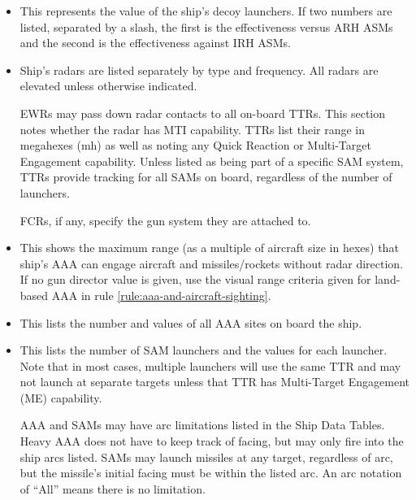 \begin{itemize}
    \item {} This represents the value of the ship's decoy launchers.  If two numbers are listed, separated by a slash, the first is the effectiveness versus ARH ASMs and the second is the effectiveness against IRH ASMs.

    \item {} Ship's radars are listed separately by type and frequency. All radars are elevated unless otherwise indicated.

        EWRs may pass down radar contacts to all on-board TTRs.  This section notes whether the radar has MTI capability. TTRs list their range in megahexes (mh) as well as noting any Quick Reaction or Multi-Target Engagement capability.  Unless listed as being part of a specific SAM system, TTRs provide tracking for all SAMs on board, regardless of the number of launchers.

        FCRs, if any, specify the gun system they are attached to.

    \item {} This shows the maximum range (as a multiple of aircraft size in hexes) that ship's AAA can engage aircraft and missiles/rockets without radar direction.  If no gun director value is given, use the visual range criteria given for land-based AAA in rule \ref{rule:aaa-and-aircraft-sighting}.

    \item {} This lists the number and values of all AAA sites on board the ship.

    \item {} This lists the number of SAM launchers and the values for each launcher.  Note that in most cases, multiple launchers will use the same TTR and may not launch at separate targets unless that TTR has Multi-Target Engagement (ME) capability.

        AAA and SAMs may have arc limitations listed in the Ship Data Tables. Heavy AAA does not have to keep track of facing, but may only fire into the ship arcs listed.  SAMs may launch missiles at any target, regardless of arc, but the missile's initial facing must be within the listed arc.  An arc notation of “All” means there is no limitation.
\end{itemize}

